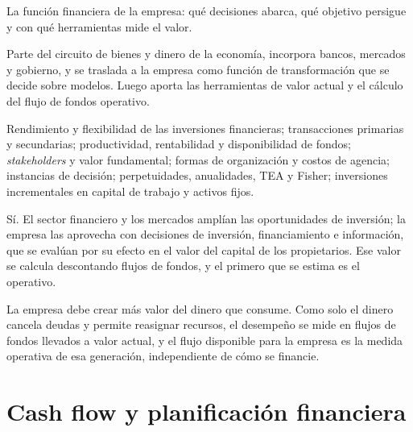 \begin{control}
La función financiera de la empresa: qué decisiones abarca, qué objetivo persigue y con qué herramientas mide el valor.

Parte del circuito de bienes y dinero de la economía, incorpora bancos, mercados y gobierno, y se traslada a la empresa como función de transformación que se decide sobre modelos. Luego aporta las herramientas de valor actual y el cálculo del flujo de fondos operativo.

Rendimiento y flexibilidad de las inversiones financieras; transacciones primarias y secundarias; productividad, rentabilidad y disponibilidad de fondos; \emph{stakeholders} y valor fundamental; formas de organización y costos de agencia; instancias de decisión; perpetuidades, anualidades, TEA y Fisher; inversiones incrementales en capital de trabajo y activos fijos.

Sí. El sector financiero y los mercados amplían las oportunidades de inversión; la empresa las aprovecha con decisiones de inversión, financiamiento e información, que se evalúan por su efecto en el valor del capital de los propietarios. Ese valor se calcula descontando flujos de fondos, y el primero que se estima es el operativo.

La empresa debe crear más valor del dinero que consume. Como solo el dinero cancela deudas y permite reasignar recursos, el desempeño se mide en flujos de fondos llevados a valor actual, y el flujo disponible para la empresa es la medida operativa de esa generación, independiente de cómo se financie.
\end{control}

\chapter{Cash flow y planificación financiera}\label{cap:u2}

\begin{ficha}
\end{ficha}

